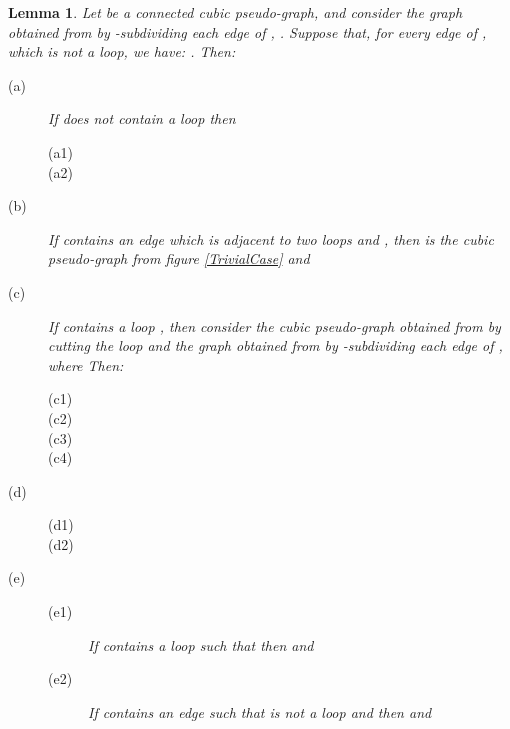 \documentclass[fleqn,12pt,twoside]{article}
\newtheorem{lemma}{Lemma}
\begin{document}
\begin{lemma}
\label{PseudoGraphSubdivision} Let  be a connected cubic
pseudo-graph, and consider the graph  obtained from  by -subdividing each edge  of , . Suppose that,
for every edge  of , which is not a loop, we have:
. Then:

\begin{description}
\item[(a)] If  does not contain a loop then

\begin{description}
\item[(a1)] 

\item[(a2)] 
\end{description}

\item[(b)] If  contains an edge  which is adjacent to two loops 
and , then  is the cubic pseudo-graph from figure
\ref{TrivialCase} and

\item[(c)] If  contains a loop , then consider the cubic
pseudo-graph  obtained from  by cutting the
loop  and the graph  obtained from 
by -subdividing each edge  of
, where
Then:

\begin{description}
\item[(c1)] 

\item[(c2)] 

\item[(c3)] 

\item[(c4)] 
\end{description}

\item[(d)]

\begin{description}
\item[(d1)] 

\item[(d2)] 
\end{description}

\item[(e)]

\begin{description}
\item[(e1)] If  contains a loop  such that  then  and 

\item[(e2)] If  contains an edge  such that  is not a loop and  then  and 
\end{description}


\end{description}
\end{lemma}
\end{document}
